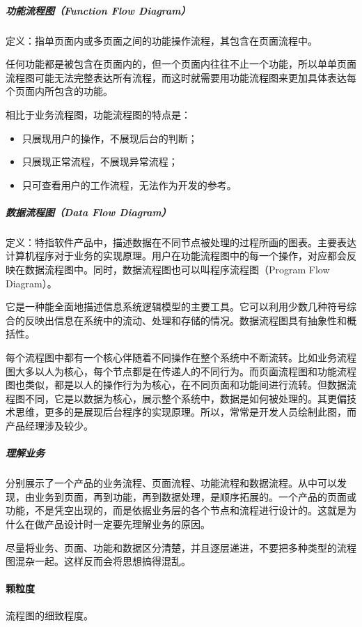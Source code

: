 \documentclass[letterpaper,11pt,english]{sphinxmanual}
\begin{document}
\subparagraph{功能流程图（Function Flow Diagram）}
\label{\detokenize{chapter_skill/flow_chart:function-flow-diagram}}
定义：指单页面内或多页面之间的功能操作流程，其包含在页面流程中。

任何功能都是被包含在页面内的，但一个页面内往往不止一个功能，所以单单页面流程图可能无法完整表达所有流程，而这时就需要用功能流程图来更加具体表达每个页面内所包含的功能。

相比于业务流程图，功能流程图的特点是：
\begin{itemize}
\item {} 
只展现用户的操作，不展现后台的判断；

\item {} 
只展现正常流程，不展现异常流程；

\item {} 
只可查看用户的工作流程，无法作为开发的参考。

\end{itemize}


\subparagraph{数据流程图（Data Flow Diagram）}
\label{\detokenize{chapter_skill/flow_chart:data-flow-diagram}}
定义：特指软件产品中，描述数据在不同节点被处理的过程所画的图表。主要表达计算机程序对于业务的实现原理。用户在功能流程图中的每一个操作，对应都会反映在数据流程图中。同时，数据流程图也可以叫程序流程图（Program
Flow Diagram）。

它是一种能全面地描述信息系统逻辑模型的主要工具。它可以利用少数几种符号综合的反映出信息在系统中的流动、处理和存储的情况。数据流程图具有抽象性和概括性。

每个流程图中都有一个核心伴随着不同操作在整个系统中不断流转。比如业务流程图大多以人为核心，每个节点都是在传递人的不同行为。而页面流程图和功能流程图也类似，都是以人的操作行为为核心，在不同页面和功能间进行流转。但数据流程图不同，它是以数据为核心，展示整个系统中，数据是如何被处理的。其更偏技术思维，更多的是展现后台程序的实现原理。所以，常常是开发人员绘制此图，而产品经理涉及较少。


\subparagraph{理解业务}
\label{\detokenize{chapter_skill/flow_chart:id7}}
分别展示了一个产品的业务流程、页面流程、功能流程和数据流程。从中可以发现，由业务到页面，再到功能，再到数据处理，是顺序拓展的。一个产品的页面或功能，不是凭空出现的，而是依据业务层的各个节点和流程进行设计的。这就是为什么在做产品设计时一定要先理解业务的原因。

尽量将业务、页面、功能和数据区分清楚，并且逐层递进，不要把多种类型的流程图混杂一起。这样反而会将思想搞得混乱。


\paragraph{颗粒度}
\label{\detokenize{chapter_skill/flow_chart:id8}}
流程图的细致程度。
\end{document}
